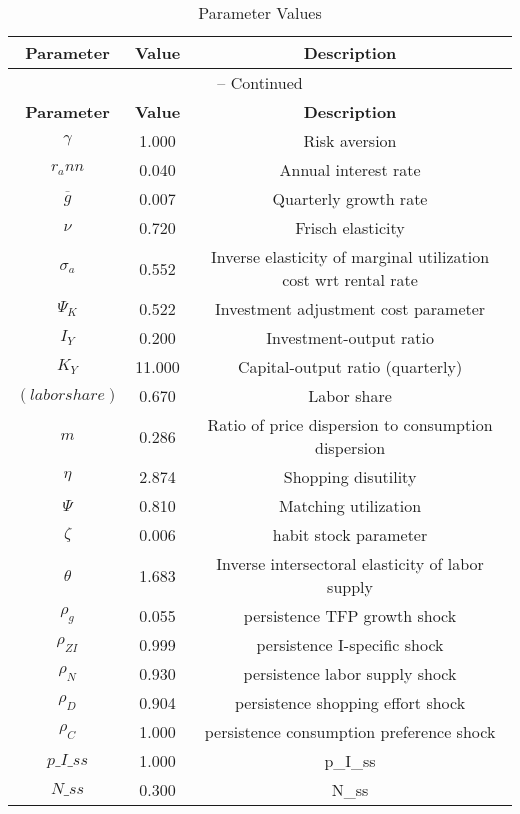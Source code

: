 \begin{center}
\begin{longtable}{ccc}
\caption{Parameter Values}\\%
\toprule%
\multicolumn{1}{c}{\textbf{Parameter}} &
\multicolumn{1}{c}{\textbf{Value}} &
 \multicolumn{1}{c}{\textbf{Description}}\\%
\midrule%
\endfirsthead
\multicolumn{3}{c}{{\tablename} \thetable{} -- Continued}\\%
\midrule%
\multicolumn{1}{c}{\textbf{Parameter}} &
\multicolumn{1}{c}{\textbf{Value}} &
  \multicolumn{1}{c}{\textbf{Description}}\\%
\midrule%
\endhead
${\gamma}$ 	 & 	 1.000 	 & 	 Risk aversion\\
${r_ann}$ 	 & 	 0.040 	 & 	 Annual interest rate\\
${\overline{g}}$ 	 & 	 0.007 	 & 	 Quarterly growth rate\\
$\nu$ 	 & 	 0.720 	 & 	 Frisch elasticity\\
${\sigma_a}$ 	 & 	 0.552 	 & 	 Inverse elasticity of marginal utilization cost wrt rental rate\\
${\Psi_K}$ 	 & 	 0.522 	 & 	 Investment adjustment cost parameter\\
${I_Y}$ 	 & 	 0.200 	 & 	 Investment-output ratio\\
${K_Y}$ 	 & 	 11.000 	 & 	 Capital-output ratio (quarterly)\\
$(labor share)$ 	 & 	 0.670 	 & 	 Labor share\\
${m}$ 	 & 	 0.286 	 & 	 Ratio of price dispersion to consumption dispersion\\
${\eta}$ 	 & 	 2.874 	 & 	 Shopping disutility\\
${\Psi}$ 	 & 	 0.810 	 & 	 Matching utilization\\
${\zeta}$ 	 & 	 0.006 	 & 	 habit stock parameter\\
${\theta}$ 	 & 	 1.683 	 & 	 Inverse intersectoral elasticity of labor supply\\
${\rho_g}$ 	 & 	 0.055 	 & 	 persistence TFP growth shock\\
${\rho_{ZI}}$ 	 & 	 0.999 	 & 	 persistence I-specific shock\\
${\rho_N}$ 	 & 	 0.930 	 & 	 persistence labor supply shock\\
${\rho_D}$ 	 & 	 0.904 	 & 	 persistence shopping effort shock\\
${\rho_C}$ 	 & 	 1.000 	 & 	 persistence consumption preference shock\\
$p\_I\_ss$ 	 & 	 1.000 	 & 	 p\_I\_ss\\
$N\_ss$ 	 & 	 0.300 	 & 	 N\_ss\\
\bottomrule%
\end{longtable}
\end{center}
